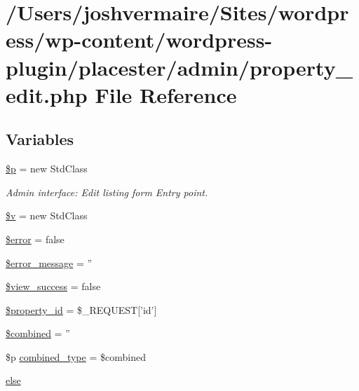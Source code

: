 \hypertarget{property__edit_8php}{
\section{/Users/joshvermaire/Sites/wordpress/wp-\/content/wordpress-\/plugin/placester/admin/property\_\-edit.php File Reference}
\label{d3/d05/property__edit_8php}
}
\subsection*{Variables}
\begin{DoxyCompactItemize}
\item 
\hyperlink{property__edit_8php_a57c5f9c8f1c65a717492ed566d2f7d39}{\$p} = new StdClass
\begin{DoxyCompactList}\small\item\em Admin interface: Edit listing form Entry point. \end{DoxyCompactList}\item 
\hyperlink{property__edit_8php_abbf14b515de9ac6be1266e3cce64c511}{\$v} = new StdClass
\item 
\hyperlink{property__edit_8php_aeba2ab722cedda53dbb7ec1a59f45550}{\$error} = false
\item 
\hyperlink{property__edit_8php_ae838cbd355959defbd4d49d0fbe7b273}{\$error\_\-message} = ''
\item 
\hyperlink{property__edit_8php_abb388ebff52ac480d577be234950bbf6}{\$view\_\-success} = false
\item 
\hyperlink{property__edit_8php_a88c3dc31d5eb48b33b9ed5cfe1ffd62f}{\$property\_\-id} = \$\_\-REQUEST\mbox{[}'id'\mbox{]}
\item 
\hyperlink{property__edit_8php_a087d68ed24331ab3812a5b17dd679580}{\$combined} = ''
\item 
\$p \hyperlink{property__edit_8php_a561369f126bf83b58bcfdd4fee1622d9}{combined\_\-type} = \$combined
\item 
\hyperlink{property__edit_8php_a0544c3fe466e421738dae463968b70ba}{else}
\end{DoxyCompactItemize}


